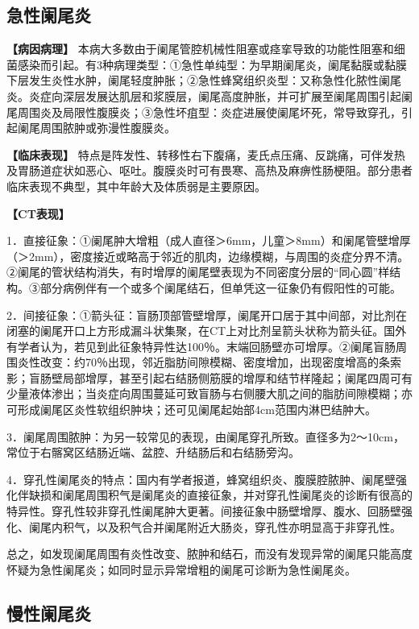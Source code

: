 \subsection{急性阑尾炎}

\textbf{【病因病理】}
本病大多数由于阑尾管腔机械性阻塞或痉挛导致的功能性阻塞和细菌感染而引起。有3种病理类型：①急性单纯型：为早期阑尾炎，阑尾黏膜或黏膜下层发生炎性水肿，阑尾轻度肿胀；②急性蜂窝组织炎型：又称急性化脓性阑尾炎。炎症向深层发展达肌层和浆膜层，阑尾高度肿胀，并可扩展至阑尾周围引起阑尾周围炎及局限性腹膜炎；③急性坏疽型：炎症进展使阑尾坏死，常导致穿孔，引起阑尾周围脓肿或弥漫性腹膜炎。

\textbf{【临床表现】}
特点是阵发性、转移性右下腹痛，麦氏点压痛、反跳痛，可伴发热及胃肠道症状如恶心、呕吐。腹膜炎时可有畏寒、高热及麻痹性肠梗阻。部分患者临床表现不典型，其中年龄大及体质弱是主要原因。

\textbf{【CT表现】}

1．直接征象：①阑尾肿大增粗（成人直径＞6mm，儿童＞8mm）和阑尾管壁增厚（＞2mm），密度接近或略高于邻近的肌肉，边缘模糊，与周围的炎症分界不清。②阑尾的管状结构消失，有时增厚的阑尾壁表现为不同密度分层的“同心圆”样结构。③部分病例伴有一个或多个阑尾结石，但单凭这一征象仍有假阳性的可能。

2．间接征象：①箭头征：盲肠顶部管壁增厚，阑尾开口居于其中间部，对比剂在闭塞的阑尾开口上方形成漏斗状集聚，在CT上对比剂呈箭头状称为箭头征。国外有学者认为，若见到此征象特异性达100％。末端回肠壁亦可增厚。②阑尾盲肠周围炎性改变：约70％出现，邻近脂肪间隙模糊、密度增加，出现密度增高的条索影；盲肠壁局部增厚，甚至引起右结肠侧筋膜的增厚和结节样隆起；阑尾四周可有少量液体渗出；当炎症向周围蔓延可致盲肠与右侧腰大肌之间的脂肪间隙模糊；亦可形成阑尾区炎性软组织肿块；还可见阑尾起始部4cm范围内淋巴结肿大。

3．阑尾周围脓肿：为另一较常见的表现，由阑尾穿孔所致。直径多为2～10cm，常位于右髂窝区结肠近端、盆腔、升结肠后和右结肠旁沟。

4．穿孔性阑尾炎的特点：国内有学者报道，蜂窝组织炎、腹膜腔脓肿、阑尾壁强化伴缺损和阑尾周围积气是阑尾炎的直接征象，并对穿孔性阑尾炎的诊断有很高的特异性。穿孔性较非穿孔性阑尾肿大更著。间接征象中肠壁增厚、腹水、回肠壁强化、阑尾内积气，以及积气合并阑尾附近大肠炎，穿孔性亦明显高于非穿孔性。

总之，如发现阑尾周围有炎性改变、脓肿和结石，而没有发现异常的阑尾只能高度怀疑为急性阑尾炎；如同时显示异常增粗的阑尾可诊断为急性阑尾炎。

\subsection{慢性阑尾炎}

